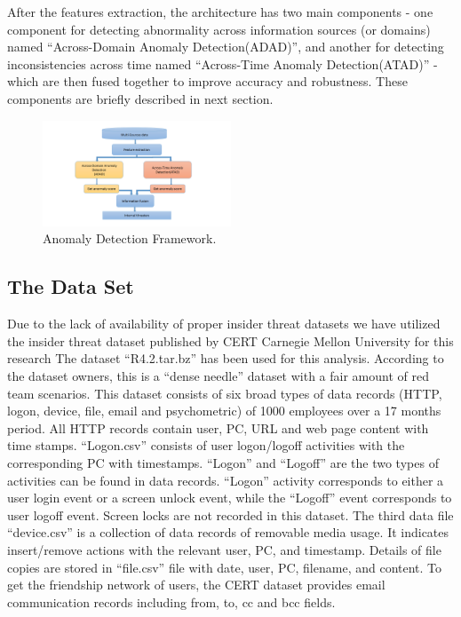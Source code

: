 \documentclass[conference]{IEEEtran}
\begin{document}
After the features extraction, the architecture has two main components - one component for detecting abnormality across information sources (or domains) named “Across-Domain Anomaly Detection(ADAD)”, and another for detecting inconsistencies across time named “Across-Time Anomaly Detection(ATAD)” - which are then fused together to improve accuracy and robustness. These components are briefly described in next section.

\begin{figure}[htb]
\centerline{\includegraphics[width = 0.5\textwidth]{figure/figure2.png}}
\caption{Anomaly Detection Framework.}
\label{fig}
\end{figure}

\subsection{The Data Set}

Due to the lack of availability of proper insider threat datasets we have utilized the insider threat
dataset published by CERT Carnegie Mellon University for this research \cite{b39} The dataset “R4.2.tar.bz” has been used for this analysis. According to the dataset owners, this is a “dense needle” dataset with a fair amount of red team scenarios. This dataset consists of six broad types of data records (HTTP, logon, device, file, email and psychometric) of 1000 employees over a 17 months period. All HTTP records contain user, PC, URL and web page content with time stamps. “Logon.csv” consists of user logon/logoff activities with the corresponding PC with timestamps. “Logon” and “Logoff” are the two types of activities can be found in data records. “Logon” activity corresponds to either a user login event or a screen unlock event, while the “Logoff” event corresponds to user logoff event. Screen locks are not recorded in this dataset. The third data file “device.csv” is a collection of data records of removable media usage. It indicates insert/remove actions with the relevant user, PC, and timestamp. Details of file copies are stored in “file.csv” file with date, user, PC, filename, and content. To get the friendship network of users, the CERT dataset provides email communication records including from, to, cc and bcc fields. 
\end{document}

